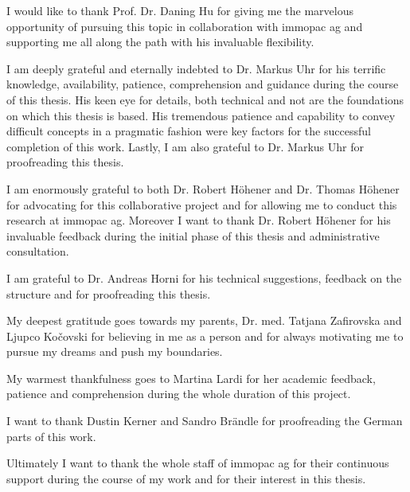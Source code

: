 \begin{acknowledgements}

I would like to thank Prof. Dr. Daning Hu for giving me the marvelous opportunity of pursuing this topic in collaboration with immopac ag and supporting me all along the path with his invaluable flexibility.

I am deeply grateful and eternally indebted to Dr. Markus Uhr for his terrific knowledge, availability, patience, comprehension and guidance during the course of this thesis. His keen eye for details, both technical and not are the foundations on which this thesis is based. His tremendous patience and capability to convey difficult concepts in a pragmatic fashion were key factors for the successful completion of this work. Lastly, I am also grateful to Dr. Markus Uhr for proofreading this thesis.

I am enormously grateful to both Dr. Robert H\"ohener and Dr. Thomas H\"ohener for advocating for this collaborative project and for allowing me to conduct this research at immopac ag. Moreover I want to thank Dr. Robert H\"ohener for his invaluable feedback during the initial phase of this thesis and administrative consultation.

I am grateful to Dr. Andreas Horni for his technical suggestions, feedback on the \latex structure and for proofreading this thesis.

My deepest gratitude goes towards my parents, Dr. med. Tatjana Zafirovska and Ljupco Ko\v{c}ovski for believing in me as a person and for always motivating me to pursue my dreams and push my boundaries.

My warmest thankfulness goes to Martina Lardi for her academic feedback, patience and comprehension during the whole duration of this project.

I want to thank Dustin Kerner and Sandro Br\"andle for proofreading the German parts of this work.

Ultimately I want to thank the whole staff of immopac ag for their continuous support during the course of my work and for their interest in this thesis.

\end{acknowledgements}